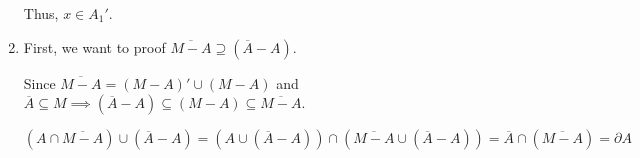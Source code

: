 \documentclass[12pt]{article}
\begin{document}
\begin{enumerate}
    Thus, $x \in A_1'$.
    \item First, we want to proof $\overline{M-A} \supseteq (\overline{A} - A)$.

    Since $\overline{M-A} = (M-A)' \cup (M-A)$ and $\overline{A} \subseteq M\implies (\overline{A} - A) \subseteq (M - A) \subseteq \overline{M-A}$.
    
    $(A \cap \overline{M-A}) \cup (\overline{A} - A) = (A\cup (\overline{A}-A)) \cap (\overline{M-A} \cup (\overline{A} - A)) = \overline{A} \cap (\overline{M-A}) = \partial A$ 
\end{enumerate}
\end{document}
